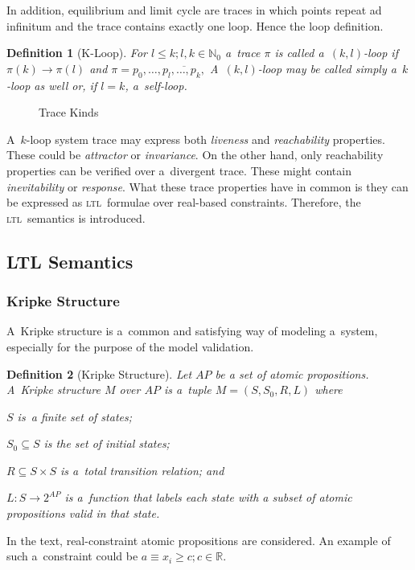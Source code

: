 \documentclass[12pt,oneside,draft]{fithesis}
\newcommand{\ltl}{\textsc{ltl}~}
\newcommand{\mReal}{\mathbb{R}}
\newcommand{\mNatural}{\mathbb{N}}
\newtheorem{mydef}{Definition}
\begin{document}
In addition, equilibrium and limit cycle are traces in which
points repeat ad infinitum and the trace contains exactly one loop.
Hence the loop definition.
\begin{mydef}[K-Loop]
For $l\leq k;l,k\in\mNatural_0$ a~trace $\pi$ is called a~$(k,l)$-loop
if $\pi(k)\rightarrow\pi(l)$ and
$\pi=p_0,\dotsc,\overline{p_{l},\dotsc,p_{k},}$
A~$(k,l)$-loop may be called simply a~$k$-loop as well or, if $l=k$,
a~self-loop.
\end{mydef}
\begin{figure}
\label{fig:trace:kinds}
\caption{Trace Kinds}
\end{figure}
A~$k$-loop system trace may express both \emph{liveness}
and \emph{reachability} properties. These could be \emph{attractor} or
\emph{invariance}\cite{rizk}. On the other hand, only reachability
properties can be verified over a~divergent trace. These might contain
\emph{inevitability} or \emph{response}\cite{rizk}. What these trace
properties have in common is they can be expressed as \ltl formulae
over real-based constraints\cite{sven}. Therefore, the \ltl semantics
is introduced.

\subsection{LTL Semantics}
\subsubsection*{Kripke Structure}
A~Kripke structure is a~common and satisfying way of modeling a~system,
especially for the purpose of the model validation\cite{clarke}.
\begin{mydef}[Kripke Structure]
Let ${AP}$ be a set of atomic propositions.
A~Kripke structure\cite{clarke} $M$ over $AP$ is a~tuple
$M=(S, S_0, R, L)$ where
\begin{inparaenum}
	\item{}$S$ is~a finite set of states;
	\item{}$S_0\subseteq{}S$ is the set of initial states;
	\item{}$R\subseteq{}S\times{}S$ is a~total transition relation; and
	\item{}$L:S\rightarrow{}2^{AP}$ is a~function that labels each state
		with a subset of atomic propositions valid in that state.
\end{inparaenum}
\end{mydef}
In the text, real-constraint atomic propositions are considered.
An example of such a~constraint could be
$a\equiv x_i \geq c;c\in\mReal$.
\end{document}
